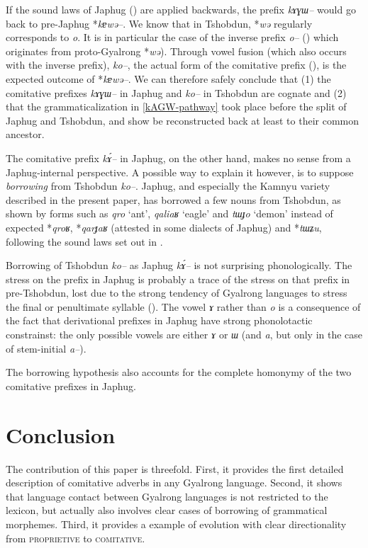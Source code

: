 \documentclass[oldfontcommands,oneside,a4paper,11pt]{article}
\newcommand{\ipa}[1]{{\phon\textit{#1}}} %
\begin{document}
If the sound laws of Japhug (\citealt{jacques04these}) are applied backwards, the prefix \ipa{kɤɣɯ--} would go back to pre-Japhug *\ipa{kɐwə--}. We know that in Tshobdun, *\ipa{wə} regularly corresponds to \ipa{o}. It is in particular the case of the inverse prefix \ipa{o--} (\citealt{jackson02rentongdengdi}) which originates from proto-Gyalrong *\ipa{wə}). Through vowel fusion (which also occurs with the inverse prefix), \ipa{ko--}, the actual form of the comitative prefix (\citealt[107]{jackson98morphology}), is the expected outcome of *\ipa{kɐwə--}. We can therefore safely conclude that (1) the comitative prefixes \ipa{kɤɣɯ--} in Japhug and \ipa{ko--} in Tshobdun are cognate and (2) that the grammaticalization in \ref{kAGW-pathway} took place before the split of Japhug and Tshobdun, and show be reconstructed back at least to their common ancestor.

The comitative prefix \ipa{kɤ́--} in Japhug, on the other hand, makes no sense from a Japhug-internal perspective. A possible way to explain it however, is to suppose \textit{borrowing} from Tshobdun \ipa{ko--}. Japhug, and especially the Kamnyu variety described in the present paper, has borrowed a few nouns from Tshobdun, as shown by forms such as \ipa{qro} `ant', \ipa{qaliaʁ} `eagle' and \ipa{tɯɟo} `demon' instead of expected *\ipa{qroʁ}, *\ipa{qarɟaʁ} (attested in some dialects of Japhug) and *\ipa{tɯʑu}, following the sound laws set out in \citet{jacques04these}.

Borrowing of Tshobdun \ipa{ko--} as Japhug \ipa{kɤ́--} is not surprising phonologically. The stress on the prefix in Japhug is probably a trace of the stress on that prefix in pre-Tshobdun, lost due to the strong tendency of Gyalrong languages to stress the final or penultimate syllable (\citealt{jackson05yingao}). The vowel \ipa{ɤ} rather than \ipa{o} is a consequence of the fact that derivational prefixes in Japhug have strong phonolotactic constrainst: the only possible vowels are either \ipa{ɤ} or \ipa{ɯ} (and \ipa{a}, but only in the case of stem-initial \ipa{a--}).

The borrowing hypothesis also accounts for the complete homonymy of the two comitative prefixes in Japhug.

\section*{Conclusion} 
The contribution of this paper is threefold. First, it provides the first detailed description of comitative adverbs in any Gyalrong language. Second, it shows that language contact between Gyalrong languages is not restricted to the lexicon, but actually also involves clear cases of borrowing of grammatical morphemes. Third, it provides a example of evolution with clear directionality from \textsc{proprietive} to \textsc{comitative}.



\end{document}
